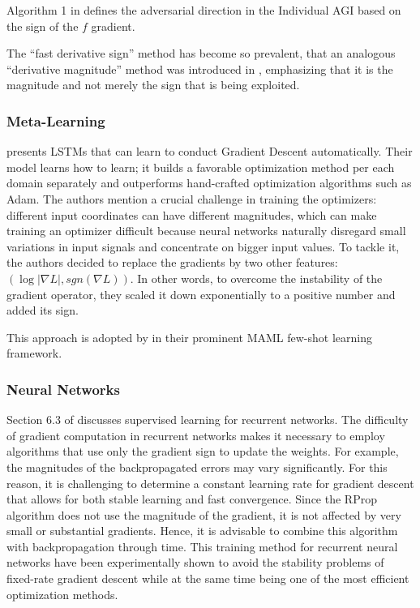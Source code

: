 \documentclass[11pt]{book}
\begin{document}
Algorithm 1 in \cite{pan2021explaining} defines the adversarial direction
in the Individual AGI based on the sign of the $f$ gradient.

The ``fast derivative sign'' method has become so prevalent, that
an analogous ``derivative magnitude'' method was introduced in \cite{rozsa2016adversarial},
emphasizing that it is the magnitude and not merely the sign that
is being exploited.


\subsubsection{Meta-Learning}

\cite{andrychowicz2016learning} presents LSTMs that can learn to
conduct Gradient Descent automatically. Their model learns how to
learn; it builds a favorable optimization method per each domain separately
and outperforms hand-crafted optimization algorithms such as Adam.
The authors mention a crucial challenge in training the optimizers:
different input coordinates can have different magnitudes, which can
make training an optimizer difficult because neural networks naturally
disregard small variations in input signals and concentrate on bigger
input values. To tackle it, the authors decided to replace the gradients
by two other features: $\left(\log\left|\nabla L\right|,sgn\left(\nabla L\right)\right)$.
In other words, to overcome the instability of the gradient operator,
they scaled it down exponentially to a positive number and added its
sign.

This approach is adopted by \cite{ravi2016optimization} in their
prominent MAML few-shot learning framework.

\subsubsection{Neural Networks}

Section 6.3 of \cite{behnke2003hierarchical} discusses supervised
learning for recurrent networks. The difficulty of gradient computation
in recurrent networks makes it necessary to employ algorithms that
use only the gradient sign to update the weights. For example, the
magnitudes of the backpropagated errors may vary significantly. For
this reason, it is challenging to determine a constant learning rate
for gradient descent that allows for both stable learning and fast
convergence. Since the RProp algorithm does not use the magnitude
of the gradient, it is not affected by very small or substantial gradients.
Hence, it is advisable to combine this algorithm with backpropagation
through time. This training method for recurrent neural networks have
been experimentally shown to avoid the stability problems of fixed-rate
gradient descent while at the same time being one of the most efficient
optimization methods.
\end{document}
